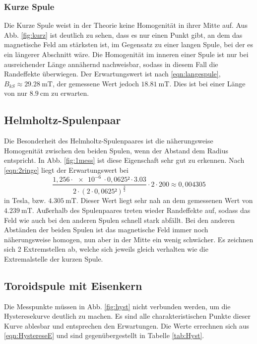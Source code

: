\subsubsection{Kurze Spule}
Die Kurze Spule weist in der Theorie keine Homogenität in ihrer Mitte auf. Aus Abb. \ref{fig:kurz} ist deutlich zu sehen, dass es nur einen Punkt gibt, an dem das magnetische Feld am stärksten ist, 
im Gegensatz zu einer langen Spule, bei der es ein längerer Abschnitt wäre. Die Homogenität im inneren einer Spule ist nur bei ausreichender Länge annähernd nachweisbar, sodass in diesem Fall die Randeffekte überwiegen.
Der Erwartungswert ist nach \ref{eqn:langespule}, $B_{kS} \approx \SI{29.28}{\milli\tesla}$, der gemessene Wert jedoch $\SI{18.81}{\milli\tesla}$. Dies ist bei einer Länge von nur $\SI{8.9}{\centi\m}$ zu erwarten.
\subsection{Helmholtz-Spulenpaar}
Die Besonderheit des Helmholtz-Spulenpaares ist die näherungsweise Homogenität zwischen den beiden Spulen, wenn der Abstand dem Radius entspricht. In Abb. \ref{fig:1mess} ist diese Eigenschaft sehr gut zu erkennen.
Nach \ref{eqn:2ringe} liegt der Erwartungswert bei
\begin{equation*}
    \frac{1,256\cdot\SI{e-6}{}\cdot0,0625²\cdot3.03}{2\cdot(2\cdot0,0625²)^\frac{3}{2}}\cdot2\cdot200 \approx 0,004305
\end{equation*}
in Tesla, bzw. $\SI{4.305}{\milli\tesla}$. Dieser Wert liegt sehr nah an dem gemessenen Wert von $\SI{4.239}{\milli\tesla}$. Außerhalb des Spulenpaares treten wieder Randeffekte auf, sodass das Feld wie auch bei den anderen Spulen
schnell stark abfällt.
Bei den anderen Abständen der beiden Spulen ist das magnetische Feld immer noch näherungsweise homogen, nun aber in der Mitte ein wenig schwächer. Es zeichnen sich 2 Extremstellen ab, welche
sich jeweils gleich verhalten wie die Extremalstelle der kurzen Spule.

\subsection{Toroidspule mit Eisenkern}
Die Messpunkte müssen in Abb. \ref{fig:hyst} nicht verbunden werden, um die Hysteresekurve deutlich zu machen. Es sind alle charakteristischen Punkte dieser Kurve ablesbar und entsprechen den
Erwartungen. Die Werte errechnen sich aus \ref{eqn:HystereseE} und sind gegenübergestellt in Tabelle \ref{tab:Hyst}.